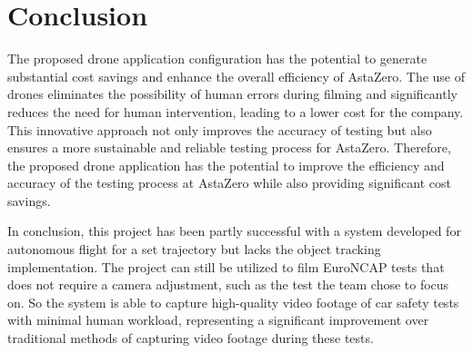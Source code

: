 \chapter{Conclusion}



The proposed drone application configuration has the potential to generate substantial cost savings and enhance the overall efficiency of AstaZero. The use of drones eliminates the possibility of human errors during filming and significantly reduces the need for human intervention, leading to a lower cost for the company. This innovative approach not only improves the accuracy of testing but also ensures a more sustainable and reliable testing process for AstaZero. Therefore, the proposed drone application has the potential to improve the efficiency and accuracy of the testing process at AstaZero while also providing significant cost savings. \newline

In conclusion, this project has been partly successful with a system developed for autonomous flight for a set trajectory but lacks the object tracking implementation. The project can still be utilized to film EuroNCAP tests that does not require a camera adjustment, such as the test the team chose to focus on. So the system is able to capture high-quality video footage of car safety tests with minimal human workload, representing a significant improvement over traditional methods of capturing video footage during these tests. \newline

